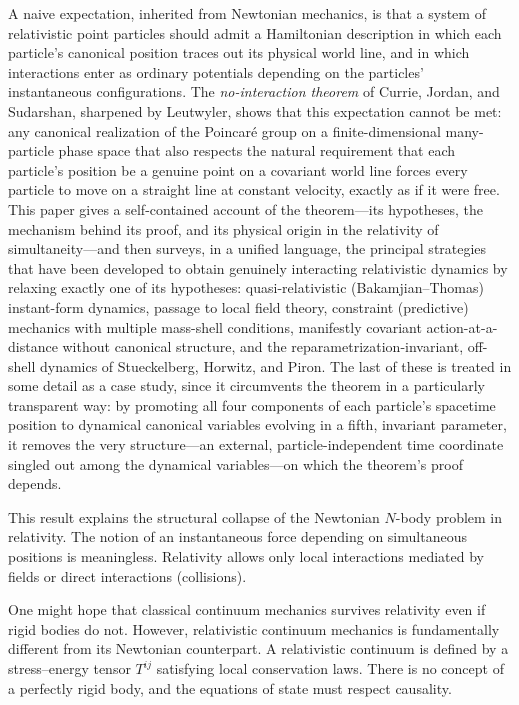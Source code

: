 A naive expectation, inherited from Newtonian mechanics, is that a system of
relativistic point particles should admit a Hamiltonian description in which
each particle's canonical position traces out its physical world line, and in
which interactions enter as ordinary potentials depending on the particles'
instantaneous configurations. The \emph{no-interaction theorem} of Currie,
Jordan, and Sudarshan, sharpened by Leutwyler, shows that this expectation
cannot be met: any canonical realization of the Poincar\'e group on a
finite-dimensional many-particle phase space that also respects the natural
requirement that each particle's position be a genuine point on a covariant
world line forces every particle to move on a straight line at constant
velocity, exactly as if it were free. This paper gives a self-contained account
of the theorem---its hypotheses, the mechanism behind its proof, and its
physical origin in the relativity of simultaneity---and then surveys, in a
unified language, the principal strategies that have been developed to obtain
genuinely interacting relativistic dynamics by relaxing exactly one of its
hypotheses: quasi-relativistic (Bakamjian--Thomas) instant-form dynamics,
passage to local field theory, constraint (predictive) mechanics with multiple
mass-shell conditions, manifestly covariant action-at-a-distance without
canonical structure, and the reparametrization-invariant, off-shell dynamics of
Stueckelberg, Horwitz, and Piron. The last of these is treated in some detail
as a case study, since it circumvents the theorem in a particularly transparent
way: by promoting all four components of each particle's spacetime position to
dynamical canonical variables evolving in a fifth, invariant parameter, it
removes the very structure---an external, particle-independent time coordinate
singled out among the dynamical variables---on which the theorem's proof
depends.

This result explains the structural collapse of the Newtonian 
$N$-body problem in relativity. The notion of an instantaneous 
force depending on simultaneous positions is meaningless. 
Relativity allows only local interactions mediated by fields or 
direct interactions (collisions).

One might hope that classical continuum mechanics survives relativity 
even if rigid bodies do not. However, relativistic continuum mechanics 
is fundamentally different from its Newtonian counterpart. 
A relativistic continuum is defined by a stress--energy tensor $T^{ij}$ 
satisfying local conservation laws. There is no concept of a 
perfectly rigid body, and the equations of state must respect causality.

